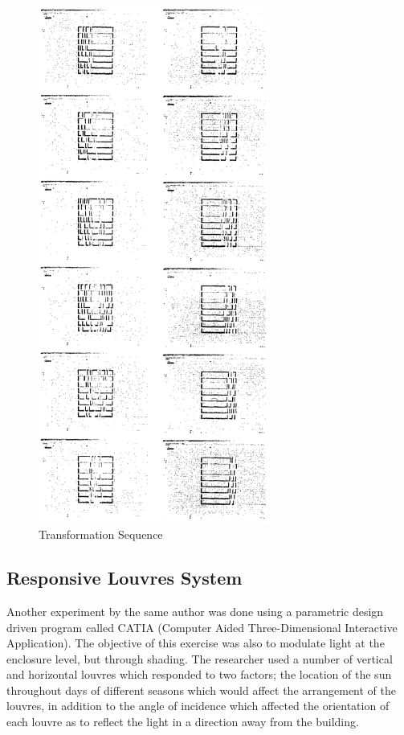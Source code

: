 \begin{figure}[htbp]
\centering
\includegraphics[height=17cm]{./Images/2-TransfSequ}
\caption[Transformation Sequence of Enclosure]{Transformation Sequence \cite{zulas04}}
\label{fig:TransSeq}
\end{figure}

\subsection{Responsive Louvres System}

Another experiment by the same author \cite{zulas04} was done using a parametric design driven program called CATIA (Computer Aided Three-Dimensional Interactive Application). The objective of this exercise was also to modulate light at the enclosure level, but through shading. The researcher used a number of vertical and horizontal louvres which responded to two factors; the location of the sun throughout days of different seasons which would affect the arrangement of the louvres, in addition to the angle of incidence which affected the orientation of each louvre as to reflect the light in a direction away from the building. 

